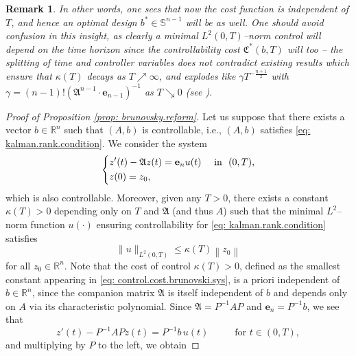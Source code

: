 \documentclass[journal,twoside,web]{ieeecolor}
\newcommand{\R}{\mathbb{R}}
\newtheorem{remark}{Remark}
\begin{document}
	\begin{remark}
	In other words, one sees that now the cost function is independent of $T$, and hence an optimal design $b^*\in\mathbb{S}^{n-1}$ will be as well. One should avoid confusion in this insight, as clearly a minimal $L^2(0,T)$--norm control will depend on the time horizon since the controllability cost $\mathfrak{C}^*(b,T)$ will too -- the
splitting of time and controller variables does not contradict existing results which ensure that $\kappa(T)$ decays as $T\nearrow\infty$, and explodes like $\gamma T^{-\frac{n+1}{2}}$ with $\gamma=(n-1)!\left(\mathfrak{A}^{n-1} \cdot \mathbf{e}_{n-1}\right)^{-1}$ as $T\searrow0$ (see \cite{seidman1988violent}).	
	\end{remark}
	\medskip

	\begin{proof}[Proof of Proposition \ref{prop: brunovsky.reform}]
	Let us suppose that there exists a vector $b\in\R^n$ such that $(A,b)$ is controllable, i.e., $(A,b)$ satisfies \eqref{eq: kalman.rank.condition}. 
	We consider the system 
	\begin{equation} \label{eq: y.system}
	\begin{dcases}
	z'(t) - \mathfrak{A} z(t) = \mathbf{e}_n u(t) &\text{ in } (0,T), \\
	z(0) = z_0,
	\end{dcases}
	\end{equation}
	which is also controllable.
	Moreover, given any $T>0$, there exists a constant $\kappa(T)>0$ depending only on $T$ and $\mathfrak{A}$ (and thus $A$) such that the minimal $L^2$--norm function $u(\cdot)$ ensuring controllability for \eqref{eq: kalman.rank.condition} satisfies
	\begin{equation} \label{eq: control.cost.brunovski.sys}
	\|u\|_{L^2(0,T)} \leqslant \kappa(T) \left\|z_0\right\|
	\end{equation}
	for all $z_0\in\R^n$. 
	Note that the cost of control $\kappa(T)>0$, defined as the smallest constant appearing in \eqref{eq: control.cost.brunovski.sys}, is a priori independent of $b\in\R^n$, since the companion matrix $\mathfrak{A}$ is itself independent of $b$ and depends only on $A$ via its characteristic polynomial. 
	Since $\mathfrak{A} = P^{-1}AP$ and $\mathbf{e}_n = P^{-1}b$, we see that
	\begin{equation}
	z'(t) - P^{-1} A P z(t) = P^{-1}b\, u(t) \hspace{1cm} \text{ for } t\in(0,T),
	\end{equation}
	and multiplying by $P$ to the left, we obtain

\end{proof}
\end{document}
